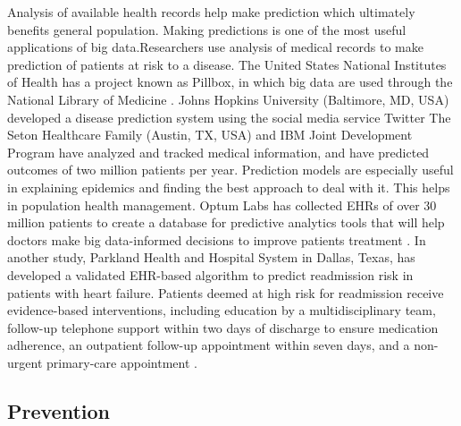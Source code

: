 \documentclass[sigconf]{acmart}
\begin{document}
Analysis of available health records help make prediction which ultimately benefits general population. Making predictions is one of 
the most useful applications of big data.Researchers use analysis of medical records to make prediction of patients at risk to 
a disease. The United States National Institutes of Health has a project known as Pillbox, in which big data are used through 
the National Library of Medicine \cite{www-tandf-com}. Johns Hopkins University (Baltimore, MD, USA) developed a disease 
prediction system using the social media service Twitter \cite{www-ncbi-nlm-nih-gov}
The Seton Healthcare Family (Austin, TX, USA) and IBM Joint Development Program have analyzed and tracked medical information, and
have predicted outcomes of two million patients per
year\cite{www-uhcjsc-com}. Prediction models are especially useful in explaining epidemics and finding the best approach to deal 
with it. This helps in population health management. Optum Labs has collected EHRs of over 30 million patients to create a database 
for predictive analytics tools that will help doctors make big 
data-informed decisions to improve patients treatment \cite{www-mapr-com}. In another study, Parkland Health and Hospital System 
in Dallas, Texas, has developed a validated EHR-based algorithm to predict readmission risk in patients with heart failure.
Patients deemed at high risk for readmission receive evidence-based interventions, including education by a multidisciplinary
team, follow-up telephone support within two days of discharge to ensure medication adherence, an outpatient follow-up 
appointment within seven days, and a non-urgent primary-care appointment \cite{www-google-com}.


\subsection{Prevention}
\end{document}
